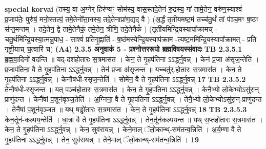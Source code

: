 \documentclass[17pt]{extarticle}
\begin{document}
                  \newline
                                                        \textbf{special korvai} \newline
              (तस्य॒ वा अ॒ग्नेर् हिर॑ण्यꣳ॒॒ सोम॑स्य॒ वास॒स्तदे॒तेन॑ रु॒द्रस्य॒ गां तामे॒तेन॒ वरु॑ण॒स्याश्वं॑ प्र॒जाप॑तेः॒ पुरु॑षं॒ मनो॒स्तल्पं॒ तमे॒तेनो᳚त्ता॒नस्य॒ तदे॒तेनाप्रा॑ण॒द्यद् वै ) (अ॒र्द्धं तृती॑यमष्ट॒मं तच्च॑तु॒र्थं तां प॑ञ्च॒मꣳ ष॒॒ष्ठꣳ स॑प्त॒मन्तम् । तदे॒तेन॒ द्वे तामे॒तेनैकं॒ तमे॒तेन॒ त्रीणि॒ तदे॒तेनैकं᳚ ) \newline
                                (तृती॑यमिन्द्रि॒यस्यापा᳚क्रामच् - चतु॒र्थमि॑न्द्रि॒यस्या॒त्मन्नु॒पाध॒ - त्ताश्वं॑ प्रतिगृ॒ह्णाति॑ - ष॒ष्ठ॑मस्येन्द्रि॒यस्याप॑क्राम -त्यष्ट॒ममि॑न्द्रि॒यस्यापा᳚क्रामत् - प्रति गृह्णी॒याच् च॒त्वारि॑ च) \textbf{(A4)} \newline \newline
                \textbf{ 2.3.5      अनुवाकं   5 - प्रश्नोत्तररूपो ब्रह्मविषयस्संवादः} \newline
                                \textbf{ TB 2.3.5.1} \newline
                  ब्र॒ह्म॒वा॒दिनो॑ वदन्ति ॥ यद्-दश॑होतारः स॒त्रमास॑त । केन॒ ते गृ॒हप॑तिना ऽऽर्द्ध्नुवन्न् । केन॑ प्र॒जा अ॑सृज॒न्तेति॑ । प्र॒जाप॑तिना॒ वै ते गृ॒हप॑तिना ऽऽर्द्ध्नुवन्न् । तेन॑ प्र॒जा अ॑सृजन्त ॥ यच्चतु॑र्.होतारः स॒त्रमास॑त । केन॒ ते गृ॒हप॑तिना ऽऽर्द्ध्नुवन्न् । केनौष॑धी-रसृज॒न्तेति॑ । सोमे॑न॒ वै ते गृ॒हप॑तिना ऽऽर्द्ध्नुवन्न् \textbf{ 17} \newline
                  \newline
                                \textbf{ TB 2.3.5.2} \newline
                  तेनौष॑धी-रसृजन्त ॥ यत् पञ्च॑होतारः स॒त्रमास॑त । केन॒ ते गृ॒हप॑तिना ऽऽर्द्ध्नुवन्न् । केनै॒भ्यो लो॒केभ्योऽसु॑रा॒न् प्राणु॑दन्त । केनै॑षां प॒शून॑वृञ्ज॒तेति॑ । अ॒ग्निना॒ वै ते गृ॒हप॑तिना ऽऽर्द्ध्नुवन्न् । तेनै॒भ्यो लो॒केभ्योऽसु॑रा॒न्-प्राणु॑दन्त । तेनै॑षां प॒शून॑वृञ्जत ॥ यथ् षड्ढो॑तारः स॒त्रमास॑त । केन॒ ते गृ॒हप॑तिना ऽऽर्द्ध्नुवन्न् \textbf{ 18} \newline
                  \newline
                                \textbf{ TB 2.3.5.3} \newline
                  केन॒र्तून॑-कल्पय॒न्तेति॑ । धा॒त्रा वै ते गृ॒हप॑तिना ऽऽर्द्ध्नुवन्न् । तेन॒र्तून॑कल्पयन्त ॥ यथ् स॒प्तहो॑तारः स॒त्रमास॑त । केन॒ ते गृ॒हप॑तिना ऽऽर्द्ध्नुवन्न् । केन॒ सुव॑रायन्न् । केने॒माल् ॅलो॒कान्थ्-सम॑तन्व॒न्निति॑ । अ॒र्य॒म्णा वै ते गृ॒हप॑तिना ऽऽर्द्ध्नुवन्न् । तेन॒ सुव॑रायन्न् । तेने॒माल् ॅलो॒कान्थ्-सम॑तन्व॒न्निति॑ । \textbf{ 19} \newline
\end{document}
